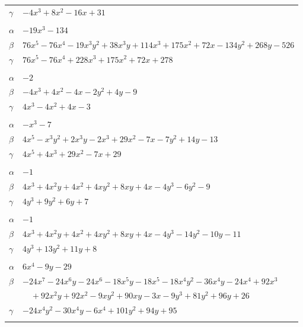 \documentclass[11pt]{article}
\begin{document}
\begin{longtable}{@{}ll@{}}
$\gamma$ & $-4x^{3}+8x^{2}-16x+31$\\
\addlinespace[3pt]
\multicolumn{2}{@{}l}{$\{i,j\}=\{22,7\}$, $k_{ij}=2\cdot 3^{3}\cdot 17$}\\
$\alpha$ & $-19x^{3}-134$\\
$\beta$ & $76x^{5}-76x^{4}-19x^{3}y^{2}+38x^{3}y+114x^{3}+175x^{2}+72x-134y^{2}+268y-526$\\
$\gamma$ & $76x^{5}-76x^{4}+228x^{3}+175x^{2}+72x+278$\\
\addlinespace[3pt]
\multicolumn{2}{@{}l}{$\{i,j\}=\{22,13\}$, $k_{ij}=2^{4}$}\\
$\alpha$ & $-2$\\
$\beta$ & $-4x^{3}+4x^{2}-4x-2y^{2}+4y-9$\\
$\gamma$ & $4x^{3}-4x^{2}+4x-3$\\
\addlinespace[3pt]
\multicolumn{2}{@{}l}{$\{i,j\}=\{22,18\}$, $k_{ij}=2^{4}\cdot 3$}\\
$\alpha$ & $-x^{3}-7$\\
$\beta$ & $4x^{5}-x^{3}y^{2}+2x^{3}y-2x^{3}+29x^{2}-7x-7y^{2}+14y-13$\\
$\gamma$ & $4x^{5}+4x^{3}+29x^{2}-7x+29$\\
\addlinespace[3pt]
\multicolumn{2}{@{}l}{$\{i,j\}=\{23,13\}$, $k_{ij}=2^{3}$}\\
$\alpha$ & $-1$\\
$\beta$ & $4x^{3}+4x^{2}y+4x^{2}+4xy^{2}+8xy+4x-4y^{3}-6y^{2}-9$\\
$\gamma$ & $4y^{3}+9y^{2}+6y+7$\\
\addlinespace[3pt]
\multicolumn{2}{@{}l}{$\{i,j\}=\{23,15\}$, $k_{ij}=2$}\\
$\alpha$ & $-1$\\
$\beta$ & $4x^{3}+4x^{2}y+4x^{2}+4xy^{2}+8xy+4x-4y^{3}-14y^{2}-10y-11$\\
$\gamma$ & $4y^{3}+13y^{2}+11y+8$\\
\addlinespace[3pt]
\multicolumn{2}{@{}l}{$\{i,j\}=\{23,18\}$, $k_{ij}=2^{3}\cdot 5$}\\
$\alpha$ & $6x^{4}-9y-29$\\
$\beta$ & $-24x^{7}-24x^{6}y-24x^{6}-18x^{5}y-18x^{5}-18x^{4}y^{2}-36x^{4}y-24x^{4}+92x^{3}$\\
 & $\quad +92x^{2}y+92x^{2}-9xy^{2}+90xy-3x-9y^{3}+81y^{2}+96y+26$\\
$\gamma$ & $-24x^{4}y^{2}-30x^{4}y-6x^{4}+101y^{2}+94y+95$\\
\addlinespace[3pt]
\multicolumn{2}{@{}l}{$\{i,j\}=\{1,3\}$, $k_{ij}=2^{2}$}\\

\end{longtable}
\end{document}
